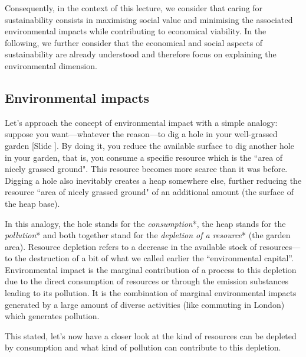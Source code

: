 \documentclass{article}
\newcounter{slide}
\begin{document}
Consequently, in the context of this lecture, we consider that caring for sustainability consists in maximising social value and minimising the associated environmental impacts while contributing to economical viability. {\color{red}In the following, we further consider that the economical and social aspects of sustainability are already understood and therefore focus on explaining the environmental dimension.}

\subsection{Environmental impacts}
\label{sec:EnvironmentalImpacts}

Let's approach the concept of environmental impact with a simple analogy: suppose you want---whatever the reason---to dig a hole in your well-grassed garden {\color{blue}[Slide ]}. By doing it, you reduce the available surface to dig another hole in your garden, that is, you consume a specific resource which is the ``area of nicely grassed ground". This resource becomes more scarce than it was before. Digging a hole also inevitably creates a heap somewhere else, further reducing the resource ``area of nicely grassed ground" of an additional amount (the surface of the heap base). 

In this analogy, the hole stands for the \emph{consumption}*, the heap stands for the \emph{pollution}* and both together stand for the \emph{depletion of a resource}* (the garden area). Resource depletion refers to a decrease in the available stock of resources---to the destruction of a bit of what we called earlier the ``environmental capital''. Environmental impact is the marginal contribution of a process to this depletion due to the direct consumption of resources or through the emission substances leading to its pollution. It is the combination of marginal environmental impacts generated by a large amount of diverse activities (like commuting in London) which generates pollution. 

This stated, let's now have a closer look at the kind of resources can be depleted by consumption and what kind of pollution can contribute to this depletion.
\end{document}

